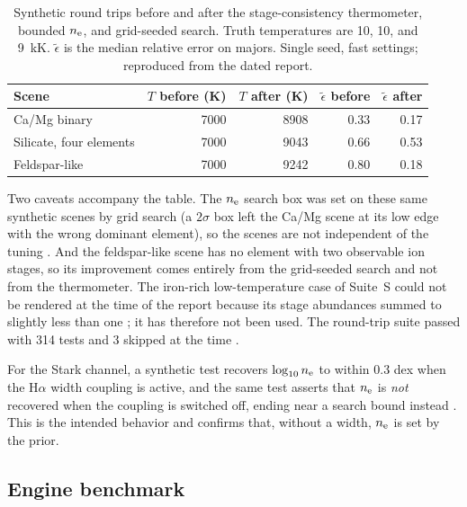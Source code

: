 \begin{table}[t]
\centering
\footnotesize
\caption{Synthetic round trips before and after the stage-consistency thermometer, bounded $n_{\mathrm{e}}$, and grid-seeded search. Truth temperatures are 10, 10, and \SI{9}{\kilo\kelvin}. $\tilde\epsilon$ is the median relative error on majors. Single seed, fast settings; reproduced from the dated report.}
\label{tab:synthetic}
\begin{tabular}{@{}lrrrr@{}}
\toprule
Scene & $T$ before (K) & $T$ after (K) & $\tilde\epsilon$ before & $\tilde\epsilon$ after \\
\midrule
Ca/Mg binary & 7000 & 8908 & 0.33 & 0.17 \\
Silicate, four elements & 7000 & 9043 & 0.66 & 0.53 \\
Feldspar-like & 7000 & 9242 & 0.80 & 0.18 \\
\bottomrule
\end{tabular}
\end{table}

Two caveats accompany the table. The $n_{\mathrm{e}}$ search box was set on these same synthetic scenes by grid search (a $2\sigma$ box left the Ca/Mg scene at its low edge with the wrong dominant element), so the scenes are not independent of the tuning %
. And the feldspar-like scene has no element with two observable ion stages, so its improvement comes entirely from the grid-seeded search and not from the thermometer. The iron-rich low-temperature case of Suite~S could not be rendered at the time of the report because its stage abundances summed to slightly less than one %
; it has therefore not been used. The round-trip suite passed with 314 tests and 3 skipped at the time %
.

For the Stark channel, a synthetic test recovers $\log_{10}n_{\mathrm{e}}$ to within 0.3 dex when the H$\alpha$ width coupling is active, and the same test asserts that $n_{\mathrm{e}}$ is \emph{not} recovered when the coupling is switched off, ending near a search bound instead %
. This is the intended behavior and confirms that, without a width, $n_{\mathrm{e}}$ is set by the prior.

\subsection{Engine benchmark}


